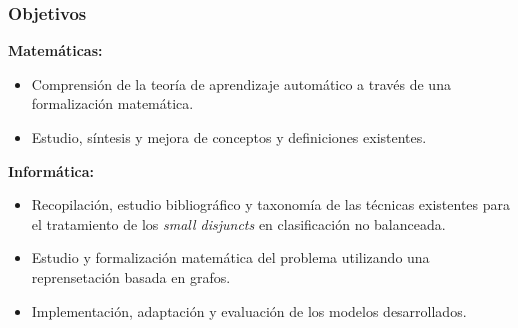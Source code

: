\begin{frame}\frametitle{Objetivos}
  \par\textbf{Matemáticas:}
  \begin{itemize}
  \item Comprensión de la teoría de aprendizaje automático a través de una formalización matemática.
  \item Estudio, síntesis y mejora de conceptos y definiciones existentes.
  \end{itemize}
  \par\textbf{Informática:}
  \begin{itemize}
  \item Recopilación, estudio bibliográfico y taxonomía de las técnicas existentes para el tratamiento de los 
  \textit{small disjuncts} en clasificación no balanceada.
  \item Estudio y formalización matemática del problema utilizando una reprensetación basada en grafos.
  \item Implementación, adaptación y evaluación de los modelos desarrollados.
 \end{itemize}
 \end{frame}